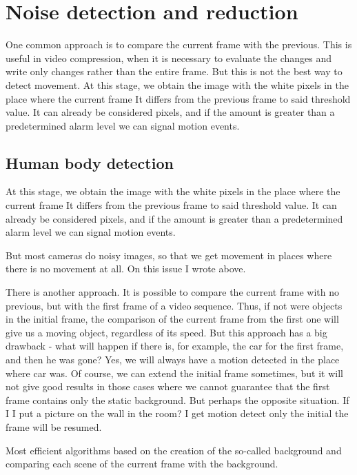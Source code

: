\chapter{Noise detection and reduction}

One common approach is to compare the current frame with the previous. This is useful in video compression, when it is necessary to evaluate the changes and write only changes rather than the entire frame. But this is not the best way to detect movement. At this stage, we obtain the image with the white pixels in the place where the current frame It differs from the previous frame to said threshold value. It can already be considered pixels, and if the amount is greater than a predetermined alarm level we can signal motion events.

\section{Human body detection}


At this stage, we obtain the image with the white pixels in the place where the current frame It differs from the previous frame to said threshold value. It can already be considered pixels, and if the amount is greater than a predetermined alarm level we can signal motion events.

But most cameras do noisy images, so that we get movement in places where there is no movement at all. On this issue I wrote above.

There is another approach. It is possible to compare the current frame with no previous, but with the first frame of a video sequence. Thus, if not were objects in the initial frame, the comparison of the current frame from the first one will give us a moving object, regardless of its speed. But this approach has a big drawback - what will happen if there is, for example, the car for the first frame, and then he was gone? Yes, we will always have a motion detected in the place where car was. Of course, we can extend the initial frame sometimes, but it will not give good results in those cases where we cannot guarantee that the first frame contains only the static background. But perhaps the opposite situation. If I I put a picture on the wall in the room? I get motion detect only the initial the frame will be resumed.

Most efficient algorithms based on the creation of the so-called background and comparing each scene of the current frame with the background.

